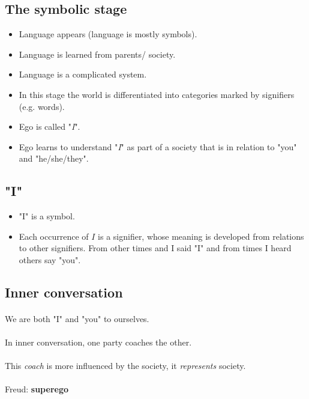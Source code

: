 \documentclass{article}
\begin{document}
	\subsection{The symbolic stage}
	\begin{itemize}
	    \item Language appears (language is mostly symbols).
	    \item Language is learned from parents/ society.
	    \item Language is a complicated system.
	    \item In this stage the world is differentiated into categories marked by signifiers (e.g. words).
	    \item Ego is called "\emph{I}".
	    \item Ego learns to understand "\emph{I}" as part of a society that is in relation to "you" and "he/she/they".
	\end{itemize}
	
	\subsection{"I"}
	\begin{itemize}
	    \item "I" is a symbol.
	    \item Each occurrence of $I$ is a signifier, whose meaning is developed from relations to other signifiers. From other times and I said "I" and from times I heard others say "you".
	\end{itemize}
	
	\subsection{Inner conversation}
	\paragraph{} We are both "I" and "you" to ourselves.
	\paragraph{} In inner conversation, one party coaches the other.
	\paragraph{} This \emph{coach} is more influenced by the society, it \emph{represents} society.
	\paragraph{} Freud: \textbf{superego}
\end{document}
